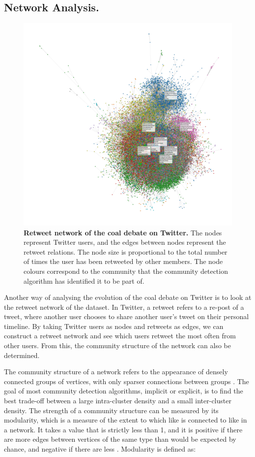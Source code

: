 \documentclass[12pt,onecolumn,twoside]{layout}
\begin{document}
\subsection*{Network Analysis.}
\begin{figure}
	\begin{center}
		\includegraphics[width=0.8\linewidth]{figures/rt_network_ht2}
	\end{center}
	\caption{\textbf{Retweet network of the coal debate on Twitter.} The nodes represent Twitter users, and the edges between nodes represent the retweet relations. The node size is proportional to the total number of times the user has been retweeted by other members. The node colours correspond to the community that the community detection algorithm has identified it to be part of.}
	\label{fig:rt_network}
\end{figure}


Another way of analysing the evolution of the coal debate on Twitter is to look at the retweet network of the dataset. In Twitter, a retweet refers to a re-post of a tweet, where another user chooses to share another user's tweet on their personal timeline. By taking Twitter users as nodes and retweets as edges, we can construct a retweet network and see which users retweet the most often from other users. From this, the community structure of the network can also be determined.

The community structure of a network refers to the appearance of densely connected groups of vertices, with only sparser connections between groups \citep{Newman8577}. The goal of most community detection algorithms, implicit or explicit, is to find the best trade-off between a large intra-cluster density and a small inter-cluster density. The strength of a community structure can be measured by its modularity, which is a measure of the extent to which like is connected to like in a network. It takes a value that is strictly less than 1, and it is positive if there are more edges between vertices of the same type than would be expected by chance, and negative if there are less \citep{Newman8577}. Modularity is defined as:
\end{document}
